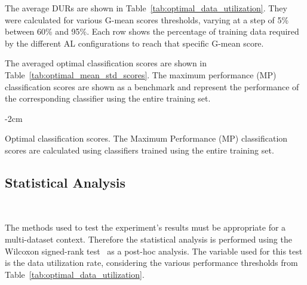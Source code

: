 \documentclass[preprint,12pt]{elsarticle}
\begin{document}
The average DURs are shown in Table~\ref{tab:optimal_data_utilization}. They
were calculated for various G-mean scores thresholds, varying at a step of 5\%
between 60\% and 95\%. Each row shows the percentage of training data required by the
different AL configurations to reach that specific G-mean score.


The averaged optimal classification scores are shown in
Table~\ref{tab:optimal_mean_std_scores}. The maximum performance (MP)
classification scores are shown as a benchmark and represent the performance
of the corresponding classifier using the entire training set. 

\begin{table}[H]
    \centering
    \addtolength{\leftskip} {-2cm}
    \addtolength{\rightskip}{-2cm}
    \caption{\label{tab:optimal_mean_std_scores}
        Optimal classification scores. The Maximum Performance (MP)
        classification scores are calculated using classifiers trained using
        the entire training set.
    }
\end{table}

\subsection{Statistical Analysis}~\label{sec:statistical-analysis}

The methods used to test the experiment's results must be appropriate for a
multi-dataset context. Therefore the statistical analysis is performed using
the Wilcoxon signed-rank
test~\cite{Wilcoxon1945} as a post-hoc analysis. The variable used for this
test is the data utilization rate, considering the various performance
thresholds from Table~\ref{tab:optimal_data_utilization}.
\end{document}
